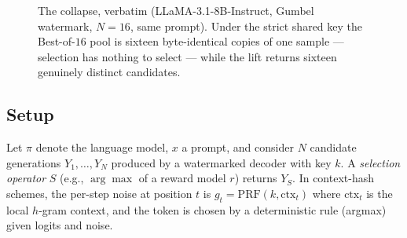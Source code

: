 \documentclass{article} %
\begin{document}
\begin{figure}[t]
\centering
{}
\caption{The collapse, verbatim (LLaMA-3.1-8B-Instruct, Gumbel watermark,
$N{=}16$, same prompt). Under the strict shared key the Best-of-$16$ pool is
sixteen byte-identical copies of one sample --- selection has nothing to
select --- while the lift returns sixteen genuinely distinct candidates.}
\label{fig:transcript}
\end{figure}

\subsection{Setup}
Let $\pi$ denote the language model, $x$ a prompt, and consider $N$ candidate
generations $Y_1,\dots,Y_N$ produced by a watermarked decoder with key $k$.
A \emph{selection operator} $S$ (e.g., $\arg\max$ of a reward model $r$) returns
$Y_{S}$. In context-hash schemes, the per-step noise at position $t$ is
$g_t = \mathrm{PRF}(k, \mathrm{ctx}_t)$ where $\mathrm{ctx}_t$ is the local
$h$-gram context, and the token is chosen by a deterministic rule (argmax) given
logits and noise.
\end{document}
